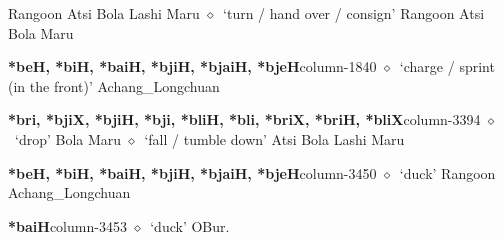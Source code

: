 \hspace{1ex}
         Rangoon 
\hspace{1ex}
         Atsi 
\hspace{1ex}
         Bola 
\hspace{1ex}
         Lashi 
\hspace{1ex}
         Maru 
\hspace{1ex}
         $\diamond$~`turn / hand over / consign'
         Rangoon 
\hspace{1ex}
         Atsi 
\hspace{1ex}
         Bola 
\hspace{1ex}
         Maru 
  \item {\footnotesize \textbf{*beH, *biH, *baiH, *bjiH, *bjaiH, *bjeH}}{\tiny column-1840}
         $\diamond$~`charge / sprint (in the front)'
         Achang\_Longchuan 
  \item {\footnotesize \textbf{*bri, *bjiX, *bjiH, *bji, *bliH, *bli, *briX, *briH, *bliX}}{\tiny column-3394}
         $\diamond$~`drop'
         Bola 
\hspace{1ex}
         Maru 
\hspace{1ex}
         $\diamond$~`fall / tumble down'
         Atsi 
\hspace{1ex}
         Bola 
\hspace{1ex}
         Lashi 
\hspace{1ex}
         Maru 
  \item {\footnotesize \textbf{*beH, *biH, *baiH, *bjiH, *bjaiH, *bjeH}}{\tiny column-3450}
         $\diamond$~`duck'
         Rangoon 
\hspace{1ex}
         Achang\_Longchuan 
  \item {\footnotesize \textbf{*baiH}}{\tiny column-3453}
         $\diamond$~`duck'
         OBur. 
